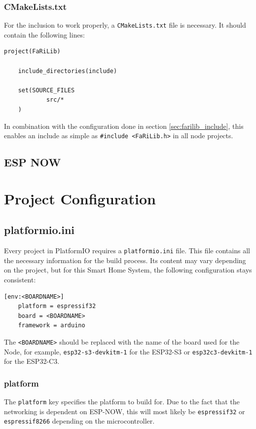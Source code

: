         \subsubsection{CMakeLists.txt}
        For the inclusion to work properly, a \texttt{CMakeLists.txt} file is
        necessary. It should contain the following lines: 
    \begin{lstlisting}[style=cppCode]
    project(FaRiLib)

    include_directories(include)

    set(SOURCE_FILES
            src/*
    )
    \end{lstlisting}
        In combination with the configuration done in section \ref{sec:farilib_include},
        this enables an include as simple as \texttt{\#include <FaRiLib.h>} in all
        node projects.

    \subsection{ESP NOW}

\section{Project Configuration}

    \subsection{platformio.ini}
    Every project in PlatformIO requires a \texttt{platformio.ini} file. This file
    contains all the necessary information for the build process. Its content may
    vary depending on the project, but for this Smart Home System, the following
    configuration stays consistent:
    \begin{lstlisting}[style=cppCode]
    [env:<BOARDNAME>]
    platform = espressif32
    board = <BOARDNAME>
    framework = arduino
    \end{lstlisting}
    The \texttt{<BOARDNAME>} should be replaced with the name of the board used
    for the Node, for example, \texttt{esp32-s3-devkitm-1} for the ESP32-S3 or
    \texttt{esp32c3-devkitm-1} for the ESP32-C3.

        \subsubsection{platform}
        The \texttt{platform} key specifies the platform to build for. Due to the
        fact that the networking is dependent on ESP-NOW, this will most likely be
        \texttt{espressif32} or \texttt{espressif8266} depending on the 
        microcontroller.
        
